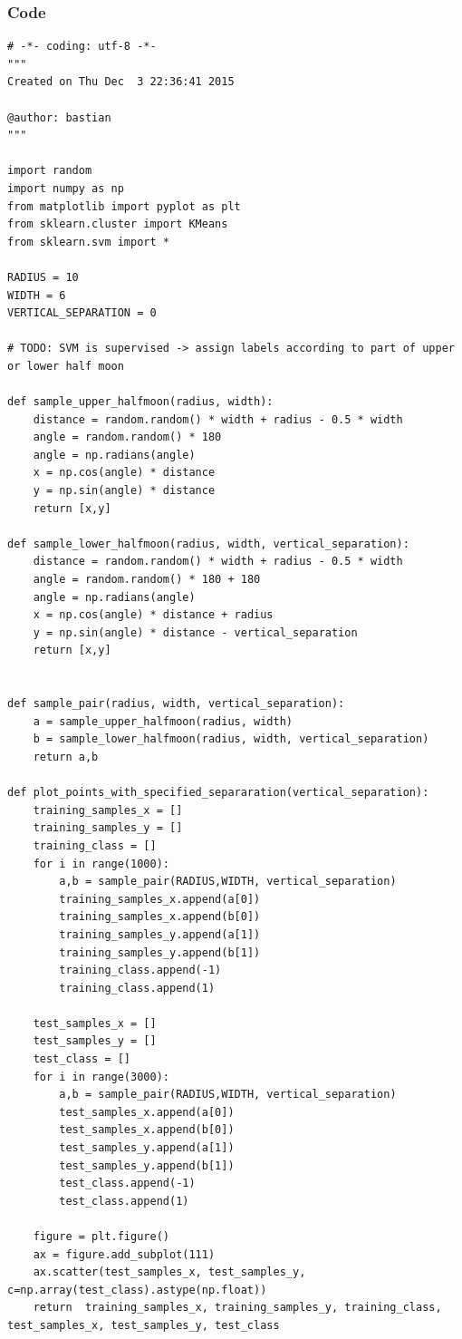 \documentclass[paper=a4, fontsize=11pt]{scrartcl} %
\numberwithin{equation}{section} %
\numberwithin{figure}{section} %
\numberwithin{table}{section} %
\begin{document}
\subsubsection{Code}
\begin{lstlisting}
# -*- coding: utf-8 -*-
"""
Created on Thu Dec  3 22:36:41 2015

@author: bastian
"""

import random
import numpy as np
from matplotlib import pyplot as plt
from sklearn.cluster import KMeans
from sklearn.svm import *

RADIUS = 10
WIDTH = 6
VERTICAL_SEPARATION = 0

# TODO: SVM is supervised -> assign labels according to part of upper or lower half moon

def sample_upper_halfmoon(radius, width):
    distance = random.random() * width + radius - 0.5 * width
    angle = random.random() * 180
    angle = np.radians(angle)
    x = np.cos(angle) * distance
    y = np.sin(angle) * distance
    return [x,y]
    
def sample_lower_halfmoon(radius, width, vertical_separation):
    distance = random.random() * width + radius - 0.5 * width
    angle = random.random() * 180 + 180
    angle = np.radians(angle)
    x = np.cos(angle) * distance + radius
    y = np.sin(angle) * distance - vertical_separation
    return [x,y]

    
def sample_pair(radius, width, vertical_separation):
    a = sample_upper_halfmoon(radius, width)
    b = sample_lower_halfmoon(radius, width, vertical_separation)
    return a,b
    
def plot_points_with_specified_separaration(vertical_separation):
    training_samples_x = []
    training_samples_y = []
    training_class = []
    for i in range(1000):
        a,b = sample_pair(RADIUS,WIDTH, vertical_separation)
        training_samples_x.append(a[0])
        training_samples_x.append(b[0])
        training_samples_y.append(a[1])
        training_samples_y.append(b[1])
        training_class.append(-1)
        training_class.append(1)
        
    test_samples_x = []
    test_samples_y = []
    test_class = []
    for i in range(3000):
        a,b = sample_pair(RADIUS,WIDTH, vertical_separation)
        test_samples_x.append(a[0])
        test_samples_x.append(b[0])
        test_samples_y.append(a[1])
        test_samples_y.append(b[1])
        test_class.append(-1)
        test_class.append(1)
        
    figure = plt.figure()
    ax = figure.add_subplot(111)
    ax.scatter(test_samples_x, test_samples_y, c=np.array(test_class).astype(np.float))
    return  training_samples_x, training_samples_y, training_class, test_samples_x, test_samples_y, test_class




\end{lstlisting}
\end{document}
